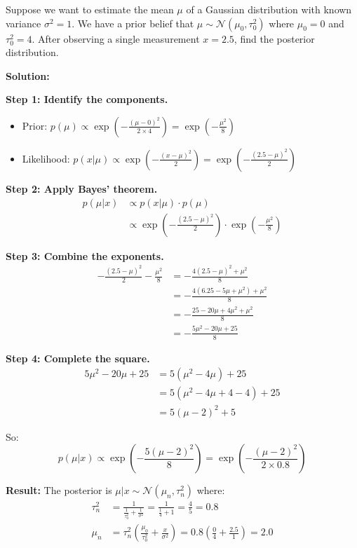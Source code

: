 \begin{examplebox}[title=Example: Bayesian Parameter Estimation]
Suppose we want to estimate the mean $\mu$ of a Gaussian distribution with known variance $\sigma^2 = 1$. We have a prior belief that $\mu \sim \mathcal{N}(\mu_0, \tau_0^2)$ where $\mu_0 = 0$ and $\tau_0^2 = 4$. After observing a single measurement $x = 2.5$, find the posterior distribution.

\textbf{Solution:}

\textbf{Step 1: Identify the components.}
\begin{itemize}
    \item Prior: $p(\mu) \propto \exp\left(-\frac{(\mu - 0)^2}{2 \times 4}\right) = \exp\left(-\frac{\mu^2}{8}\right)$
    \item Likelihood: $p(x|\mu) \propto \exp\left(-\frac{(x-\mu)^2}{2}\right) = \exp\left(-\frac{(2.5-\mu)^2}{2}\right)$
\end{itemize}

\textbf{Step 2: Apply Bayes' theorem.}
\begin{align*}
p(\mu|x) &\propto p(x|\mu) \cdot p(\mu) \\
&\propto \exp\left(-\frac{(2.5-\mu)^2}{2}\right) \cdot \exp\left(-\frac{\mu^2}{8}\right)
\end{align*}

\textbf{Step 3: Combine the exponents.}
\begin{align*}
-\frac{(2.5-\mu)^2}{2} - \frac{\mu^2}{8} &= -\frac{4(2.5-\mu)^2 + \mu^2}{8} \\
&= -\frac{4(6.25 - 5\mu + \mu^2) + \mu^2}{8} \\
&= -\frac{25 - 20\mu + 4\mu^2 + \mu^2}{8} \\
&= -\frac{5\mu^2 - 20\mu + 25}{8}
\end{align*}

\textbf{Step 4: Complete the square.}
\begin{align*}
5\mu^2 - 20\mu + 25 &= 5(\mu^2 - 4\mu) + 25 \\
&= 5(\mu^2 - 4\mu + 4 - 4) + 25 \\
&= 5(\mu - 2)^2 + 5
\end{align*}

So:
\begin{equation*}
p(\mu|x) \propto \exp\left(-\frac{5(\mu-2)^2}{8}\right) = \exp\left(-\frac{(\mu-2)^2}{2 \times 0.8}\right)
\end{equation*}

\textbf{Result:} The posterior is $\mu|x \sim \mathcal{N}(\mu_n, \tau_n^2)$ where:
\begin{align*}
\tau_n^2 &= \frac{1}{\frac{1}{\tau_0^2} + \frac{1}{\sigma^2}} = \frac{1}{\frac{1}{4} + 1} = \frac{4}{5} = 0.8 \\
\mu_n &= \tau_n^2 \left(\frac{\mu_0}{\tau_0^2} + \frac{x}{\sigma^2}\right) = 0.8\left(\frac{0}{4} + \frac{2.5}{1}\right) = 2.0
\end{align*}


\end{examplebox}
